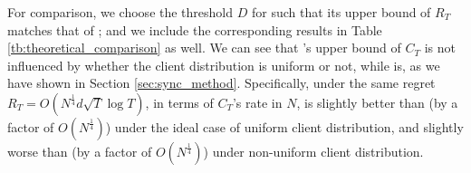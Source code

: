 
For comparison, we choose the threshold $D$ for \modelbaseline{} such that its upper bound of $R_{T}$ matches that of \modelone{}; and we include the corresponding results in Table \ref{tb:theoretical_comparison} as well.
We can see that \modelone{}'s upper bound of $C_{T}$ is not influenced by whether the client distribution is uniform or not, while \modelbaseline{} is, as we have shown in Section \ref{sec:sync_method}.
Specifically, under the same regret $R_{T}=O(N^{\frac{1}{4}}d\sqrt{T}\log{T})$, in terms of $C_{T}$'s rate in $N$, \modelbaseline{} is slightly better than \modelone{} (by a factor of $O(N^{\frac{1}{4}})$) under the ideal case of uniform client distribution, and slightly worse than \modelone{} (by a factor of $O(N^{\frac{1}{4}})$) under non-uniform client distribution.


